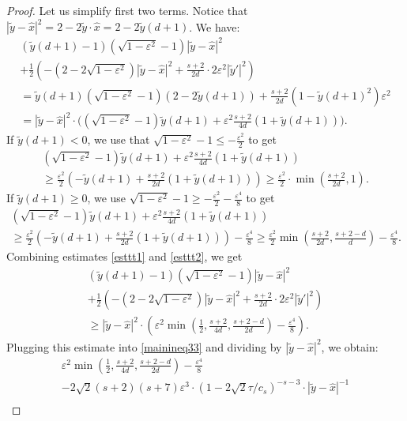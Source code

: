 \documentclass[12pt]{amsart}
\theoremstyle{definition}
\def\ep{\varepsilon}
\newcommand{\1}{\mathbf{1}}
\begin{document}
\begin{proof}
Let us simplify first two terms. Notice that $|\tilde y-\hat{x}|^2 = 2-2\tilde y \cdot \hat{x} = 2-2\tilde y(d+1)$. We have:
\begin{multline}
(\tilde y(d+1)-1)(\sqrt{1-\ep^2}-1)|\tilde y-\hat{x}|^{2} \\ 
+\frac12 \left(-(2-2\sqrt{1-\ep^2})|\tilde{y}-\hat{x}|^2+\frac{s+2}{2d}\cdot 2\ep^2 |\tilde y'|^2\right) \\ 
=\tilde{y}(d+1)(\sqrt{1-\ep^2}-1)(2-2\tilde{y}(d+1))+\frac{s+2}{2d}(1-\tilde y(d+1)^2)\ep^2  \\
=|\tilde y-\hat{x}|^2 \cdot \Big((\sqrt{1-\ep^2}-1)\tilde y(d+1)+\ep^2 \frac{s+2}{4d}(1+\tilde y(d+1))\Big).
\end{multline}
If $\tilde{y}(d+1)<0$, we use that $\sqrt{1-\ep^2} -1 \leqslant -\frac{\ep^2}2$ to get
\begin{multline}\label{esttt1}
(\sqrt{1-\ep^2}-1)\tilde y(d+1)+\ep^2 \frac{s+2}{4d}(1+\tilde y(d+1))  \\ 
\geqslant\frac{\ep^2}{2}\left(-\tilde y(d+1)+\frac{s+2}{2d}(1+\tilde y(d+1))\right) 
\geqslant \frac{\ep^2}2 \cdot \min\left(\frac{s+2}{2d}, 1\right).
\end{multline}
If $\tilde{y}(d+1)\geqslant 0$, we use $\sqrt{1-\ep^2} -1 \geqslant -\frac{\ep^2}2-\frac{\ep^4}8$ to get
\begin{multline}\label{esttt2}
(\sqrt{1-\ep^2}-1)\tilde y(d+1)+\ep^2 \frac{s+2}{4d}(1+\tilde y(d+1)) \\ 
\geqslant \frac{\ep^2}{2}\left(-\tilde y(d+1)+\frac{s+2}{2d}(1+\tilde y(d+1))\right)  - \frac{\ep^4}8 \geqslant \frac{\ep^2}2 \min\left(\frac{s+2}{2d}, \frac{s+2-d}{d}\right) - \frac{\ep^4}8.
\end{multline}
Combining estimates \eqref{esttt1} and \eqref{esttt2}, we get
\begin{multline}
(\tilde y(d+1)-1)(\sqrt{1-\ep^2}-1)|\tilde y-\hat{x}|^{2} \\ 
+\frac12 \left(-(2-2\sqrt{1-\ep^2})|\tilde{y}-\hat{x}|^2+\frac{s+2}{2d}\cdot 2\ep^2 |\tilde y'|^2\right)   \\ 
\geqslant |\tilde y - \hat{x}|^2 \cdot \left(\ep^2\min\left(\frac12, \frac{s+2}{4d}, \frac{s+2-d}{2d}\right) - \frac{\ep^4}8\right).
\end{multline}
Plugging this estimate into \eqref{mainineq33} and dividing by $|\tilde y-\hat{x}|^2$, we obtain:
\begin{multline}
\ep^2\min\left(\frac12, \frac{s+2}{4d}, \frac{s+2-d}{2d}\right) - \frac{\ep^4}8  \\
-2\sqrt{2}(s+2)(s+7)\ep^3 \cdot (1-2\sqrt{2}\tau/c_s)^{-s-3}\cdot |\tilde y-\hat{x}|^{-1}  \\ 

\end{multline}
\end{proof}
\end{document}
